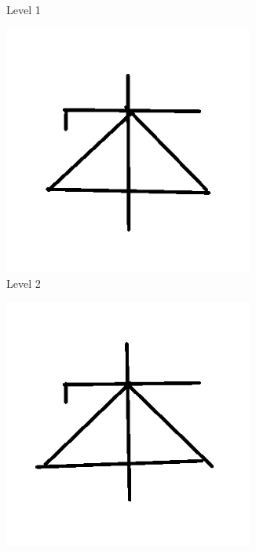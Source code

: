 \begin{figure}[h]
\begin{subfigure}[b]{0.25\textwidth}
                \caption{Level 1}
        \end{subfigure}
                \begin{subfigure}[b]{0.25\textwidth}
                \centering
                \includegraphics[width=0.9\textwidth]{figures/Results/Sketches150f/level2.png}
                \caption{Level 2}
        \end{subfigure}
                \begin{subfigure}[b]{0.25\textwidth}
                \centering
                \includegraphics[width=0.9\textwidth]{figures/Results/Sketches150f/level3.png}

\end{subfigure}
\end{figure}

